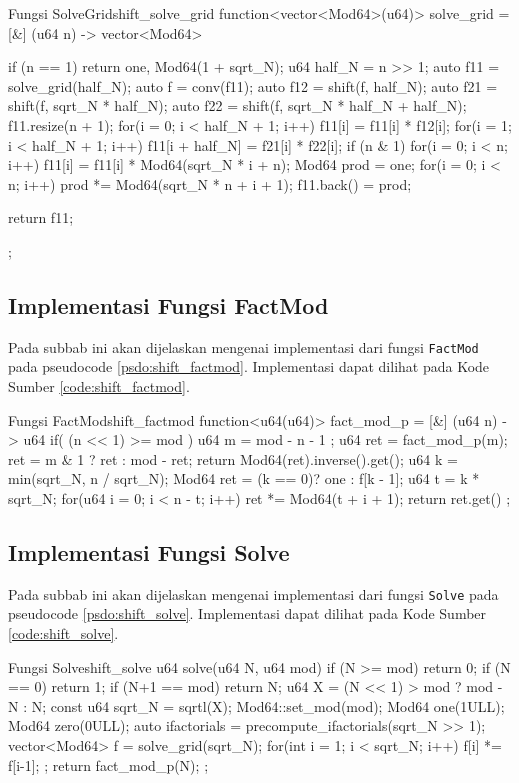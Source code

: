 \begin{code}[firstnumber=1]{Fungsi SolveGrid}{shift_solve_grid}
	function<vector<Mod64>(u64)> solve_grid = [&] (u64 n) -> vector<Mod64> {
        if (n == 1) return {one, Mod64(1 + sqrt_N)};
        u64 half_N = n >> 1;    
        auto f11 = solve_grid(half_N);
        auto f = conv(f11);
        auto f12 = shift(f, half_N);
        auto f21 = shift(f, sqrt_N * half_N);
        auto f22 = shift(f, sqrt_N * half_N + half_N);
        f11.resize(n + 1);
        for(i = 0; i < half_N + 1; i++){ f11[i] = f11[i] * f12[i]; }
        for(i = 1; i < half_N + 1; i++){ f11[i + half_N] = f21[i] * f22[i]; }
        if (n & 1){
            for(i = 0; i < n; i++){ f11[i] = f11[i] * Mod64(sqrt_N * i + n); }
            Mod64 prod = one;
            for(i = 0; i < n; i++){ prod *= Mod64(sqrt_N * n + i + 1); }
            f11.back() = prod;
        }

        return f11;
    };
\end{code}

\subsection{Implementasi Fungsi FactMod}
Pada subbab ini akan dijelaskan mengenai implementasi dari fungsi \texttt{FactMod} pada pseudocode \ref{psdo:shift_factmod}. Implementasi dapat dilihat pada Kode Sumber \ref{code:shift_factmod}.

\begin{code}[firstnumber=1]{Fungsi FactMod}{shift_factmod}
	function<u64(u64)> fact_mod_p = [&] (u64 n) -> u64 {
        if( (n << 1) >= mod ) {
            u64 m = mod - n - 1 ;
            u64 ret = fact_mod_p(m);
            ret = m & 1 ? ret : mod - ret;
            return Mod64(ret).inverse().get();
        }
        u64 k = min(sqrt_N, n / sqrt_N);
        Mod64 ret = (k == 0)? one : f[k - 1];
        u64 t = k * sqrt_N;
        for(u64 i = 0; i < n - t; i++){
            ret *= Mod64(t + i + 1);
        }
        return ret.get() %
    };
\end{code}


\subsection{Implementasi Fungsi Solve}
Pada subbab ini akan dijelaskan mengenai implementasi dari fungsi \texttt{Solve} pada pseudocode \ref{psdo:shift_solve}. Implementasi dapat dilihat pada Kode Sumber \ref{code:shift_solve}.

\begin{code}[firstnumber=1]{Fungsi Solve}{shift_solve}
	u64 solve(u64 N, u64 mod) {
		if (N >= mod) return 0;
		if (N == 0) return 1;
		if (N+1 == mod) return N;
		u64 X = (N << 1) > mod ? mod - N : N;
		const u64 sqrt_N = sqrtl(X);
		Mod64::set_mod(mod);
		Mod64 one(1ULL);
		Mod64 zero(0ULL);
		auto ifactorials = precompute_ifactorials(sqrt_N >> 1);
		vector<Mod64> f = solve_grid(sqrt_N);
		for(int i = 1; i < sqrt_N; i++){ f[i] *= f[i-1]; };
		return fact_mod_p(N);
	};
\end{code}



